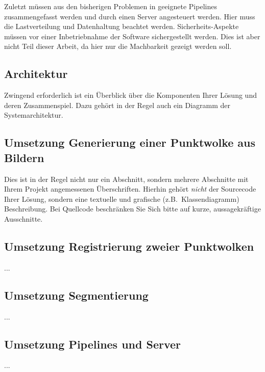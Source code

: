 \documentclass[12pt,titlepage,twoside]{article}
\begin{document}
Zuletzt müssen aus den bisherigen Problemen in geeignete Pipelines zusammengefasst werden und durch einen Server angesteuert werden. Hier muss die Lastverteilung und Datenhaltung beachtet werden. 
Sicherheits-Aspekte müssen vor einer Inbetriebnahme der Software sichergestellt werden. Dies ist aber nicht Teil dieser Arbeit, da hier nur die Machbarkeit gezeigt werden soll.

\subsection{Architektur}
\label{sec:realisierung:architektur}
Zwingend erforderlich ist ein Überblick über die Komponenten Ihrer Lösung
und deren Zusammenspiel. Dazu gehört in der Regel auch ein Diagramm
der Systemarchitektur.

\subsection{Umsetzung Generierung einer Punktwolke aus Bildern}
\label{sec:realisierung:implementierung1}
Dies ist in der Regel nicht nur ein Abschnitt, sondern mehrere Abschnitte
mit Ihrem Projekt angemessenen Überschriften. Hierhin gehört {\em nicht}
der Sourcecode Ihrer Lösung, sondern eine textuelle und grafische
(z.B.~Klassendiagramm) Beschreibung. Bei Quellcode beschränken Sie Sich
bitte auf kurze, aussagekräftige Ausschnitte.

\subsection{Umsetzung Registrierung zweier Punktwolken}
\label{sec:realisierung:implementierung2}
...

\subsection{Umsetzung Segmentierung}
\label{sec:realisierung:implementierung2}
...

\subsection{Umsetzung Pipelines und Server}
\label{sec:realisierung:implementierung2}
...
\end{document}

